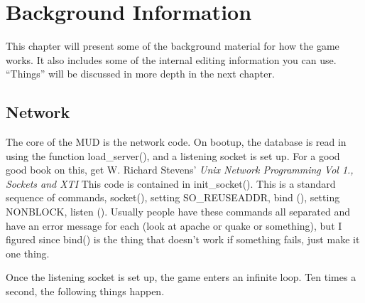 \chapter{Background Information}

This chapter will present some of the background material for how the
game works. It also includes some of the internal editing information
you can use. ``Things'' will be discussed in more depth in the next
chapter.

\section{Network}

The core of the MUD is the network code. On bootup, the database is
read in using the function load\_server(), and a listening socket is
set up. For a good good book on this, get W. Richard Stevens'
{\it{Unix Network Programming Vol 1., Sockets and XTI}} This code is
contained in init\_socket(). This is a standard sequence of commands,
socket(), setting SO\_REUSEADDR, bind (), setting NONBLOCK, listen
(). Usually people have these commands all separated and have an error
message for each (look at apache or quake or something), but I figured
since bind() is the thing that doesn't work if something fails, just
make it one thing.

Once the listening socket is set up, the game enters an infinite
loop. Ten times a second, the following things happen.

